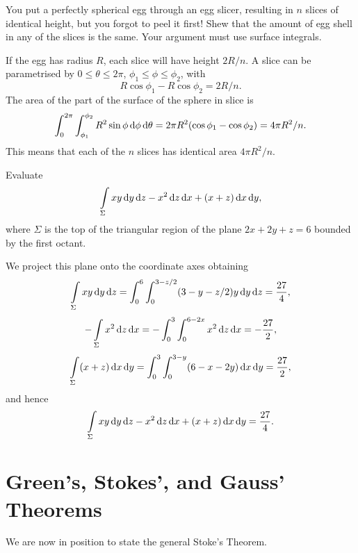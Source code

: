 \begin{problem}
You put a perfectly spherical egg through an egg slicer, resulting
in $n$ slices of identical height, but you forgot to peel it first!
Shew that the amount of egg shell in any of the slices is the same.
Your argument must use surface integrals.\begin{answer} If the egg
has radius $R$,  each slice will have height $2R/n$. A slice can be
parametrised by $0 \leq \theta \leq 2\pi$, $\phi_1 \leq \phi \leq
\phi_2$, with $$R\cos\phi_1 - R\cos\phi_2 = 2R/n.$$ The area of the
part of the surface of the sphere in slice is $$\dint _0
^{2\pi}\dint_{\phi_1} ^{\phi_2} R^2\sin\phi \d{\phi}\d{\theta} = 2\pi
R^2(\cos\phi_1 - \cos\phi_2 ) = 4\pi R^2/n.$$ This means that each
of the $n$ slices has identical area $4\pi R^2 /n$.
\end{answer}
\end{problem}

\begin{problem}
Evaluate  $$\dint \limits_\Sigma xy\d{y}\d{z} - x^2\d{z} \d{x} + (x
+ z)\d{x} \d{y},
$$where $\Sigma$ is the top of the triangular region of the plane $2x + 2y + z =
6$ bounded by the first octant. \begin{answer} We project this plane
onto the coordinate axes obtaining
$$ \dint \limits_\Sigma xy\d{y}\d{z} = \dint _0 ^6 \dint _0 ^{3-z/2} (3-y-z/2)y \d{y}  \d{z} =  \frac{27}{4},  $$
$$ -\dint \limits_\Sigma x^2\d{z}\d{x} = -\dint _0 ^3 \dint _0 ^{6-2x} x^2 \d{z}  \d{x} =  -\frac{27}{2},  $$
$$ \dint \limits_\Sigma (x + z)\d{x}\d{y} = \dint _0 ^3 \dint _0 ^{3 - y} (6 - x - 2y) \d{x}  \d{y} =  \frac{27}{2},  $$
and hence
$$\dint \limits_\Sigma xy\d{y}\d{z} -
x^2\d{z} \d{x} + (x + z)\d{x} \d{y} = \frac{27}{4}.
$$
\end{answer}
\end{problem}
\section{Green's, Stokes', and Gauss' Theorems}
We are now in position to state the general Stoke's Theorem.

